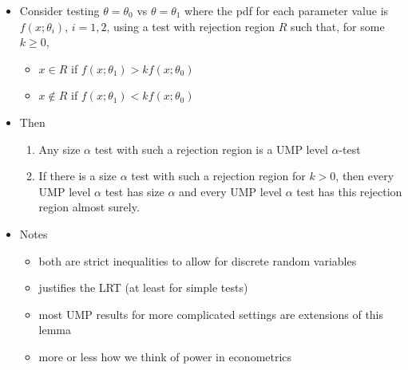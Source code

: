\begin{itemize}
\item Consider testing $\theta = \theta_0$ vs $\theta = \theta_1$
       where the pdf for each parameter value is $f(x; \theta_i)$, $i
       = 1,2$, using a test with rejection region $R$ such that, for
       some $k \geq 0$,
\begin{itemize}
\item $x \in R$ if $f(x; \theta_1) > k f(x; \theta_0)$
\item $x \notin R$ if $f(x; \theta_1) < k f(x; \theta_0)$
\end{itemize}
\item Then
\begin{enumerate}
\item Any size $\alpha$ test with such a rejection region is a UMP level $\alpha$-test
\item If there is a size $\alpha$ test with such a rejection
          region for $k > 0$, then every UMP level $\alpha$ test has
          size $\alpha$ and every UMP level $\alpha$ test has this
          rejection region almost surely.
\end{enumerate}
\item Notes
\begin{itemize}
\item both are strict inequalities to allow for discrete random
         variables
\item justifies the LRT (at least for simple tests)
\item most UMP results for more complicated settings are extensions
         of this lemma
\item more or less how we think of power in econometrics
\end{itemize}
\end{itemize}

